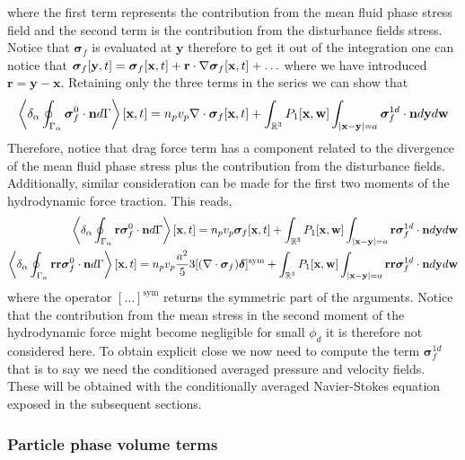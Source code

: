 where the first term represents the contribution from the mean fluid phase stress field and the second term is the contribution from the disturbance fields stress. 
Notice that $\bm\sigma_f$ is evaluated at $\textbf{y}$ therefore to get it out of the integration one can notice that $\bm\sigma_f[\textbf{y},t] = \bm\sigma_f[\textbf{x},t] + \textbf{r}\cdot \mathbf{\nabla}\bm\sigma_f[\textbf{x},t]+ \ldots$
where we have introduced $\textbf{r} = \textbf{y} - \textbf{x}$. 
Retaining only the three terms in the series we can show that 
\begin{equation}
    \left<\delta_\alpha \oint_{\Gamma_{\alpha}} \bm\sigma_f^0\cdot\textbf{n} d\Gamma\right>[\textbf{x},t]
    =
    n_p v_p 
    \mathbf{\nabla}\cdot\bm\sigma_f[\textbf{x},t]
    +
    \int_{\mathbb{R}^3}
    P_1[\textbf{x},\textbf{w}]
    \int_{|\textbf{x}-\textbf{y}|=a}
    \bm\sigma_f^{1d} \cdot \textbf{n}
    d\textbf{y}d\textbf{w}
    \label{eq:drag_final}
\end{equation}
Therefore, notice that drag force term has a component related to the divergence of the mean fluid phase stress plus the contribution from the disturbance fields. 
Additionally, similar consideration can be made for the first two moments of the hydrodynamic force traction. 
This reads,
\begin{align}
    \left<\delta_\alpha \oint_{\Gamma_{\alpha}} \textbf{r}\bm\sigma_f^0\cdot\textbf{n} d\Gamma\right>[\textbf{x},t]
    =
    n_p v_p \bm\sigma_f[\textbf{x},t]
    +
    \int_{\mathbb{R}^3}
    P_1[\textbf{x},\textbf{w}]
    \int_{|\textbf{x}-\textbf{y}|=a}
    \textbf{r}\bm\sigma_f^{1d} \cdot \textbf{n}
    d\textbf{y}
    d\textbf{w}
    \\
    \left<\delta_\alpha \oint_{\Gamma_{\alpha}} \textbf{rr}\bm\sigma_f^0\cdot\textbf{n} d\Gamma\right>[\textbf{x},t]
    =
    n_pv_p  \frac{a^2}{5} 3 [(\mathbf{\nabla}\cdot \bm\sigma_f)\bm\delta]^\text{sym}
    +
    \int_{\mathbb{R}^3}
    P_1[\textbf{x},\textbf{w}]
    \int_{|\textbf{x}-\textbf{y}|=a}
    \textbf{rr}\bm\sigma_f^{1d} \cdot \textbf{n}
    d\textbf{y}
    d\textbf{w}
    \label{eq:second_mom_general}
\end{align}
where the operator $[\ldots]^\text{sym}$ returns the symmetric part of the arguments.
Notice that the contribution from the mean stress in the second moment of the hydrodynamic force might become negligible for small $\phi_d$ it is therefore not considered here. 
To obtain explicit close we now need to compute the term $\bm\sigma^{1d}_f$ that is to say we need the conditioned averaged pressure and velocity fields.  
These will be obtained with the conditionally averaged Navier-Stokes equation exposed in the subsequent sections. 

\subsubsection{Particle phase volume terms}

